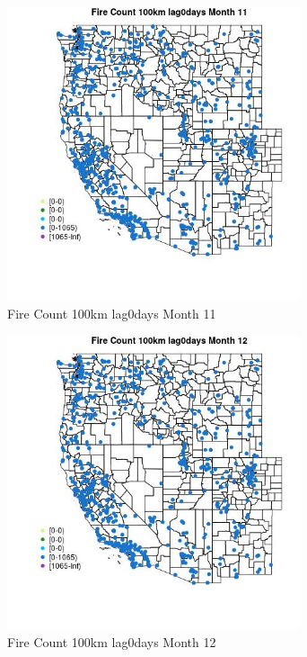 \begin{figure} 
\centering  
\includegraphics[width=0.77\textwidth]{Code_Outputs/Report_ML_input_PM25_Step4_part_f_de_duplicated_aves_prioritize_24hr_obswNAs_MapObsMo11Fire_Count_100km_lag0days.jpg} 
\caption{\label{fig:Report_ML_input_PM25_Step4_part_f_de_duplicated_aves_prioritize_24hr_obswNAsMapObsMo11Fire_Count_100km_lag0days}Fire Count 100km lag0days Month 11} 
\end{figure} 
 

\begin{figure} 
\centering  
\includegraphics[width=0.77\textwidth]{Code_Outputs/Report_ML_input_PM25_Step4_part_f_de_duplicated_aves_prioritize_24hr_obswNAs_MapObsMo12Fire_Count_100km_lag0days.jpg} 
\caption{\label{fig:Report_ML_input_PM25_Step4_part_f_de_duplicated_aves_prioritize_24hr_obswNAsMapObsMo12Fire_Count_100km_lag0days}Fire Count 100km lag0days Month 12} 
\end{figure} 
 

